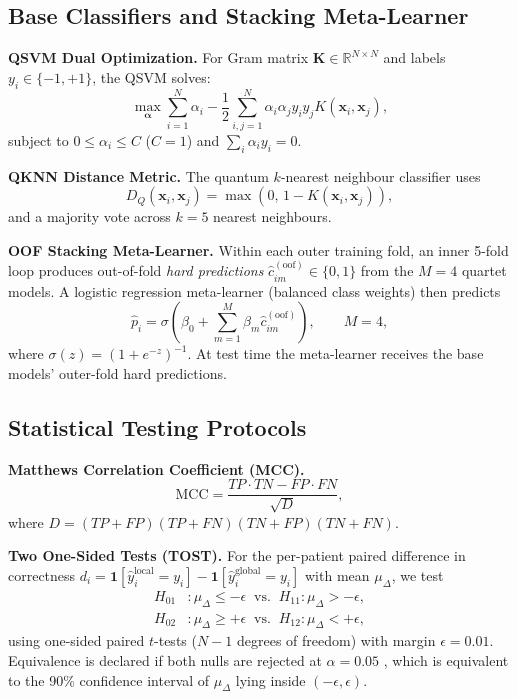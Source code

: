 \documentclass[journal,twocolumn]{IEEEtran}
\begin{document}
\subsection{Base Classifiers and Stacking Meta-Learner}

\textbf{QSVM Dual Optimization.} For Gram matrix $\mathbf{K} \in \mathbb{R}^{N \times N}$ and labels $y_i \in \{-1, +1\}$, the QSVM solves:
\begin{equation}
    \max_{\boldsymbol{\alpha}} \sum_{i=1}^{N} \alpha_i - \frac{1}{2}\sum_{i,j=1}^{N}\alpha_i\alpha_j y_i y_j K(\mathbf{x}_i,\mathbf{x}_j),
    \label{eq:qsvm_dual}
\end{equation}
subject to $0 \leq \alpha_i \leq C$ ($C=1$) and $\sum_i \alpha_i y_i = 0$.

\textbf{QKNN Distance Metric.} The quantum $k$-nearest neighbour classifier uses
\begin{equation}
    D_Q(\mathbf{x}_i, \mathbf{x}_j) = \max\!\left(0,\, 1 - K(\mathbf{x}_i, \mathbf{x}_j)\right),
    \label{eq:qknn_dist}
\end{equation}
and a majority vote across $k=5$ nearest neighbours.

\textbf{OOF Stacking Meta-Learner.} Within each outer training fold, an inner 5-fold loop produces out-of-fold \emph{hard predictions} $\hat{c}_{im}^{(\text{oof})} \in \{0,1\}$ from the $M=4$ quartet models. A logistic regression meta-learner (balanced class weights) then predicts
\begin{equation}
    \hat{p}_i = \sigma\!\left(\beta_0 + \sum_{m=1}^{M} \beta_m \hat{c}_{im}^{(\text{oof})}\right), \qquad M=4,
    \label{eq:oof_stack}
\end{equation}
where $\sigma(z) = (1 + e^{-z})^{-1}$. At test time the meta-learner receives the base models' outer-fold hard predictions.

\subsection{Statistical Testing Protocols}

\textbf{Matthews Correlation Coefficient (MCC).}
\begin{equation}
    \text{MCC} = \frac{TP \cdot TN - FP \cdot FN}{\sqrt{D}},
    \label{eq:mcc}
\end{equation}
where $D = (TP+FP)(TP+FN)(TN+FP)(TN+FN)$.

\textbf{Two One-Sided Tests (TOST).} For the per-patient paired difference in correctness $d_i = \mathbf{1}[\hat{y}^{\text{local}}_i = y_i] - \mathbf{1}[\hat{y}^{\text{global}}_i = y_i]$ with mean $\mu_\Delta$, we test
\begin{align}
    H_{01}&: \mu_\Delta \leq -\epsilon \;\; \text{vs.} \;\; H_{11}: \mu_\Delta > -\epsilon, \label{eq:tost1}\\
    H_{02}&: \mu_\Delta \geq +\epsilon \;\; \text{vs.} \;\; H_{12}: \mu_\Delta < +\epsilon, \label{eq:tost2}
\end{align}
using one-sided paired $t$-tests ($N-1$ degrees of freedom) with margin $\epsilon = 0.01$. Equivalence is declared if both nulls are rejected at $\alpha = 0.05$ \cite{wellek2010testing}, which is equivalent to the 90\% confidence interval of $\mu_\Delta$ lying inside $(-\epsilon, \epsilon)$.
\end{document}
